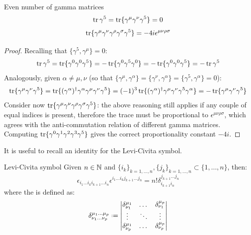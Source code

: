 \begin{proposition}[before upper = {\tcbtitle}]{Even number of gamma matrices}{}
  \begin{equation}
    \operatorname{tr} \gamma^5 = \operatorname{tr}\{\gamma^\mu \gamma^\nu \gamma^5\} = 0
  \end{equation}
  \begin{equation}
    \operatorname{tr}\{\gamma^\mu \gamma^\nu \gamma^\rho \gamma^\sigma \gamma^5\} = -4i \epsilon^{\mu \nu \rho \sigma}
  \end{equation}
\end{proposition}

\begin{proofbox}
  \begin{proof}
    Recalling that $ \{\gamma^5 , \gamma^\mu\} = 0 $:
    \begin{equation*}
      \operatorname{tr} \gamma^5 = \operatorname{tr}\{\gamma^0 \gamma^0 \gamma^5\} = - \operatorname{tr}\{\gamma^0 \gamma^5 \gamma^0\} = - \operatorname{tr}\{\gamma^0 \gamma^0 \gamma^5\} = - \operatorname{tr} \gamma^5
    \end{equation*}
    Analogously, given $ \alpha \neq \mu , \nu $ (so that $ \{\gamma^\mu , \gamma^\alpha\} = \{\gamma^\nu , \gamma^\alpha\} = \{\gamma^5 , \gamma^\alpha\} = 0 $):
    \begin{equation*}
      \operatorname{tr}\{\gamma^\mu \gamma^\nu \gamma^5\} = \operatorname{tr}\{(\gamma^\alpha)^\dagger \gamma^\alpha \gamma^\mu \gamma^\nu \gamma^5\} = (-1)^3 \operatorname{tr}\{(\gamma^\alpha)^\dagger \gamma^\mu \gamma^\nu \gamma^5 \gamma^\alpha\} = - \operatorname{tr}\{\gamma^\mu \gamma^\nu \gamma^5\}
    \end{equation*}
    Consider now $ \operatorname{tr}\{\gamma^\mu \gamma^\nu \gamma^\rho \gamma^\sigma \gamma^5\} $: the above reasoning still applies if any couple of equal indices is present, therefore the trace must be proportional to $ \epsilon^{\mu \nu \rho \sigma} $, which agrees with the anti-commutation relation of different gamma matrices. Computing $ \operatorname{tr}\{\gamma^0 \gamma^1 \gamma^2 \gamma^3 \gamma^5\} $ gives the correct proportionality constant $ -4i $.
  \end{proof}
\end{proofbox}

It is useful to recall an identity for the Levi-Civita symbol.

\begin{lemma}{Levi-Civita symbol}{}
  Given $ n \in \mathbb{N} $ and $ \{i_k\}_{k = 1,\dots,n} , \{j_k\}_{k = 1,\dots,n} \subset \{1,\dots,n\} $, then:
  \begin{equation}
    \epsilon_{i_1 \dots i_k i_{k+1} \dots i_n} \epsilon^{i_1 \dots i_k j_{k+1} \dots j_n} = n! \delta^{j_{k+1} \dots j_n}_{i_{k+1} i_n}
  \end{equation}
  where the  is defined as:
  \begin{equation}
    \delta^{\mu_1 \dots \mu_p}_{\nu_1 \dots \nu_p} \defeq
    \begin{vmatrix}
      \delta^{\mu_1}_{\nu_1} & \dots & \delta^{\mu_p}_{\nu_1} \\
      \vdots & \ddots & \vdots \\
      \delta^{\mu_1}_{\nu_p} & \dots & \delta^{\mu_p}_{\nu_p}
    \end{vmatrix}
  \end{equation}
\end{lemma}

